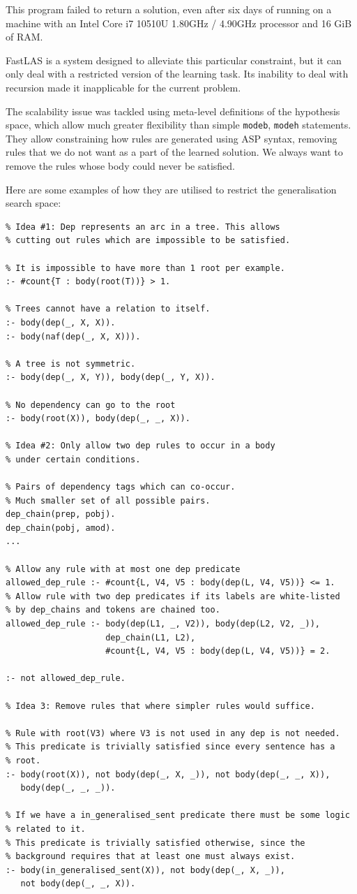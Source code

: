 This program failed to return a solution, even after six days of running on a machine with an Intel Core i7 10510U 1.80GHz / 4.90GHz processor and 16 GiB of RAM.

FastLAS \cite{RefWorks:RefID:19-law2020fastlas:} is a system designed to alleviate this particular constraint, but it can only deal with a restricted version of the learning task.
Its inability to deal with recursion made it inapplicable for the current problem.

The scalability issue was tackled using meta-level definitions of the hypothesis \cite{RefWorks:RefID:97-lawilasp} space, which allow much greater flexibility than simple \verb+modeb+, \verb+modeh+ statements. 
They allow constraining how rules are generated using ASP syntax, removing rules that we do not want as a part of the learned solution.
We always want to remove the rules whose body could never be satisfied.

Here are some examples of how they are utilised to restrict the generalisation search space:
\begin{verbatim}
% Idea #1: Dep represents an arc in a tree. This allows 
% cutting out rules which are impossible to be satisfied.
    
% It is impossible to have more than 1 root per example.
:- #count{T : body(root(T))} > 1.

% Trees cannot have a relation to itself.
:- body(dep(_, X, X)).
:- body(naf(dep(_, X, X))).

% A tree is not symmetric.
:- body(dep(_, X, Y)), body(dep(_, Y, X)).

% No dependency can go to the root
:- body(root(X)), body(dep(_, _, X)).

% Idea #2: Only allow two dep rules to occur in a body
% under certain conditions. 

% Pairs of dependency tags which can co-occur.
% Much smaller set of all possible pairs.
dep_chain(prep, pobj).
dep_chain(pobj, amod).
...

% Allow any rule with at most one dep predicate
allowed_dep_rule :- #count{L, V4, V5 : body(dep(L, V4, V5))} <= 1.
% Allow rule with two dep predicates if its labels are white-listed
% by dep_chains and tokens are chained too.
allowed_dep_rule :- body(dep(L1, _, V2)), body(dep(L2, V2, _)), 
                    dep_chain(L1, L2), 
                    #count{L, V4, V5 : body(dep(L, V4, V5))} = 2.

:- not allowed_dep_rule.

% Idea 3: Remove rules that where simpler rules would suffice.

% Rule with root(V3) where V3 is not used in any dep is not needed.
% This predicate is trivially satisfied since every sentence has a 
% root.
:- body(root(X)), not body(dep(_, X, _)), not body(dep(_, _, X)), 
   body(dep(_, _, _)).

% If we have a in_generalised_sent predicate there must be some logic 
% related to it.
% This predicate is trivially satisfied otherwise, since the 
% background requires that at least one must always exist.
:- body(in_generalised_sent(X)), not body(dep(_, X, _)), 
   not body(dep(_, _, X)).


\end{verbatim}

